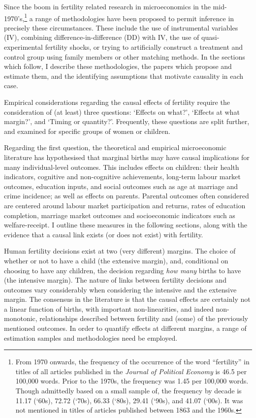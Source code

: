 Since the boom in fertility related research in microeconomics in the mid-%
1970's,\footnote{From 1970 onwards, the frequency of the occurrence of the word 
``fertility'' 
in titles of all articles published in the \emph{Journal of Political Economy} 
is 46.5 per 100,000 words. Prior to the 1970s, the frequency was 1.45 per 
100,000 words. Though admittedly based on a small sample of, the frequency by 
decade is 11.17 (`60s), 72.72 (`70s), 66.33 (`80s), 29.41 (`90s), and 41.07 
(`00s). It was not mentioned in titles of articles published between 1863 and 
the 1960s.} a range of methodologies have been proposed to permit inference 
in precisely these circumstances. These include the use of instrumental 
variables (IV), combining difference-in-difference (DD) with IV, the use of 
quasi-experimental fertility shocks, or trying to artificially construct a 
treatment and control group using family members or other matching 
methods.  In the sections which follow, I describe these methodologies, the 
papers which propose and estimate them, and the identifying assumptions that
motivate causality in each case.

Empirical considerations regarding the causal effects of fertility require the
consideration of (at least) three questions: `Effects on what?', `Effects at
what margin?', and `Timing or quantity?'.  Frequently, these questions are 
split further, and examined for specific groups of women or children.

Regarding the first question, the theoretical and empirical microeconomic 
literature has hypothesised that marginal births may have causal implications 
for many individual-level outcomes.  This includes effects on children: their 
health indicators, cognitive and non-cognitive achievements, long-term labour 
market outcomes, education inputs, and social outcomes such as age at marriage 
and crime incidence; as well as effects on parents. Parental outcomes often 
considered are centered around labour market participation and returns, rates 
of education completion, marriage market outcomes and socioeconomic indicators 
such as welfare-receipt.  I outline these measures in the following sections, 
along with the evidence that a causal link exists (or does not exist) with 
fertility.

Human fertility decisions exist at two (very different) margins.  The choice of
whether or not to have a child (the extensive margin), and, conditional on 
choosing to have any children, the decision regarding \emph{how many} births
to have (the intensive margin).  The nature of links between fertility decisions
and outcomes vary considerably when considering the intensive and the extensive
margin.  The consensus in the literature is that the causal effects are 
certainly not a linear function of births, with important non-linearities, and 
indeed non-monotonic, relationships described between fertility and (some) of 
the previously mentioned outcomes. In order to quantify effects at different 
margins, a range of estimation samples and methodologies need be employed.  

